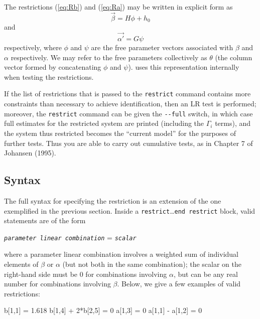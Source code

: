 The restrictions (\ref{eq:Rb}) and (\ref{eq:Ra}) may be written in
explicit form as
\begin{equation}
\label{eq:vecbeta}
\vec{\beta} = H\phi + h_0
\end{equation}
and
\begin{equation}
\label{eq:vecalpha}
\vec{\alpha'} = G\psi
\end{equation}
respectively, where $\phi$ and $\psi$ are the free parameter vectors
associated with $\beta$ and $\alpha$ respectively.  We may refer
to the free parameters collectively as $\theta$ (the column vector
formed by concatenating $\phi$ and $\psi$).   uses this
representation internally when testing the restrictions.

If the list of restrictions that is passed to the \texttt{restrict}
command contains more constraints than necessary to achieve
identification, then an LR test is performed; moreover, the
\texttt{restrict} command can be given the \verb|--full| switch, in
which case full estimates for the restricted system are printed
(including the $\Gamma_i$ terms), and the system thus restricted
becomes the ``current model'' for the purposes of further tests.  Thus
you are able to carry out cumulative tests, as in Chapter 7 of
Johansen (1995).

\subsection{Syntax}
\label{sec:vecm-restr-syntax}

The full syntax for specifying the restriction is an extension of the
one exemplified in the previous section. Inside a
\texttt{restrict}\ldots\texttt{end restrict} block, valid statements
are of the form
\begin{center}
  \texttt{\emph{parameter linear combination}} = \emph{\texttt{scalar}}
\end{center}
where a parameter linear combination involves a weighted sum of
individual elements of $\beta$ or $\alpha$ (but not both in the same
combination); the scalar on the right-hand side must be 0 for
combinations involving $\alpha$, but can be any real number for
combinations involving $\beta$. Below, we give a few examples of valid
restrictions:
\begin{code}
  b[1,1] = 1.618
  b[1,4] + 2*b[2,5] = 0
  a[1,3] = 0
  a[1,1] - a[1,2] = 0
\end{code}

